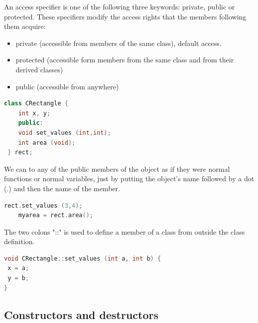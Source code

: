 \documentclass[12pt,oneside]{book}
\begin{document}
An access specifier is one of the following three keywords: private, public or protected. These specifiers modify the access rights that the members following them acquire:
\begin{itemize}
	\item private (accessible from members of the same class), default access.
	\item protected (accessible form members from the same class and from their derived classes)
	\item public (accessible from anywhere)
\end{itemize}
\begin{lstlisting}[language=C++]
class CRectangle { 
    int x, y; 
    public: 
    void set_values (int,int);
    int area (void); 
 } rect; 
\end{lstlisting}
We can to any of the public members of the object as if they were normal functions or normal variables, just by putting the object's name followed by a dot (.) and then the name of the member.\\
\begin{lstlisting}[language=C++]
    rect.set_values (3,4);
    myarea = rect.area(); 
\end{lstlisting}
The two colons "::" is used to define a member of a class from outside the class definition.\\
\begin{lstlisting}[language=C++]
void CRectangle::set_values (int a, int b) { 
 x = a; 
 y = b; 
} 
\end{lstlisting}

\begin{center}\end{center}
\subsection{Constructors and destructors}
\end{document}
